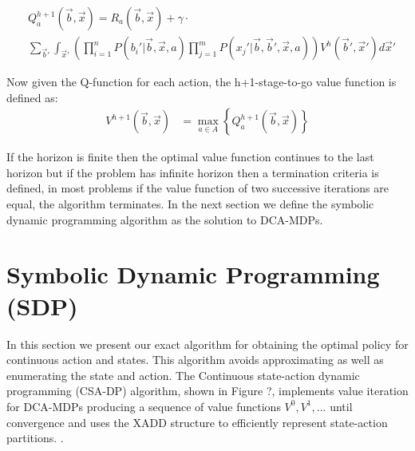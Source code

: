 \documentclass[letterpaper]{article}
\renewcommand{\-}{\text{-}}
\begin{document}
\vspace{-3mm}

{\footnotesize
\begin{align}
& Q_a^{h+1}(\vec{b},\vec{x}) = R_a(\vec{b},\vec{x}) + \gamma \cdot \label{eq:qfun} \\ 
& \sum_{\vec{b}'} \int_{\vec{x}'} \left( \prod_{i=1}^n P(b_i'|\vec{b},\vec{x},a) \prod_{j=1}^m P(x_j'|\vec{b},\vec{b}',\vec{x},a) \right) V^h(\vec{b}',\vec{x}') d\vec{x}' \nonumber
\end{align}}

Now given the Q-function for each action, the h+1-stage-to-go value function is defined as: 
\begin{align}
V^{h+1}(\vec{b},\vec{x}) & = \max_{a \in A} \left\{ Q^{h+1}_a(\vec{b},\vec{x}) \right\} \label{eq:vfun}
\end{align}

If the horizon is finite then the optimal value function continues to the last horizon but if the problem has infinite horizon then a termination criteria is defined, in most problems if the value function of two successive iterations are equal, the algorithm terminates. In the next section we define the symbolic dynamic programming algorithm as the solution to DCA-MDPs.

\section{Symbolic Dynamic Programming (SDP)}

In this section we present our exact algorithm for obtaining the optimal policy for continuous action and states. This algorithm avoids approximating as well as enumerating the state and action. The Continuous state-action dynamic programming (CSA-DP) algorithm, shown in Figure ?, implements value iteration for DCA-MDPs producing a sequence of value functions $V^0,V^1,...$ until convergence and uses the XADD structure to efficiently represent state-action partitions. . \\
\end{document}

